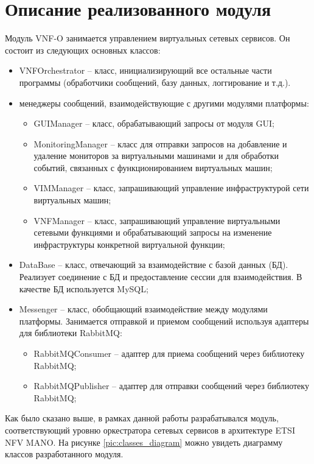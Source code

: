\documentclass[oneside,final,14pt,a4paper]{extreport}
\begin{document}
\section{Описание реализованного модуля}
\label{sec:developed_module}
Модуль VNF-O занимается управлением виртуальных сетевых сервисов. Он состоит из следующих основных классов:
\begin{itemize}
	\item VNFOrchestrator -- класс, инициализирующий все остальные части программы (обработчики сообщений, базу данных, логгирование и т.д.).
	\item менеджеры сообщений, взаимодействующие с другими модулями платформы:
	\begin{itemize}
		\item GUIManager -- класс, обрабатывающий запросы от модуля GUI;
		\item MonitoringManager -- класс для отправки запросов на добавление и удаление мониторов за виртуальными машинами и для обработки событий, связанных с функционированием виртуальных машин;
		\item VIMManager -- класс, запрашивающий управление инфраструктурой сети виртуальных машин;
		\item VNFManager -- класс, запрашивающий управление виртуальными сетевыми функциями и обрабатывающий запросы на изменение инфраструктуры конкретной виртуальной функции;
	\end{itemize}
	\item DataBase -- класс, отвечающий за взаимодействие с базой данных (БД). Реализует соединение с БД и предоставление сессии для взаимодействия. В качестве БД используется MySQL;
	\item Messenger -- класс, обобщающий взаимодействие между модулями платформы. Занимается отправкой и приемом сообщений используя адаптеры для библиотеки RabbitMQ:
	\begin{itemize}
		\item RabbitMQConsumer -- адаптер для приема сообщений через библиотеку RabbitMQ;
		\item RabbitMQPublisher -- адаптер для отправки сообщений через библиотеку RabbitMQ;
	\end{itemize}
\end{itemize}
Как было сказано выше, в рамках данной работы разрабатывался модуль, соответствующий уровню оркестратора сетевых сервисов в архитектуре ETSI NFV MANO. 
На рисунке \ref{pic:classes_diagram} можно увидеть диаграмму классов разработанного модуля.
\end{document}
